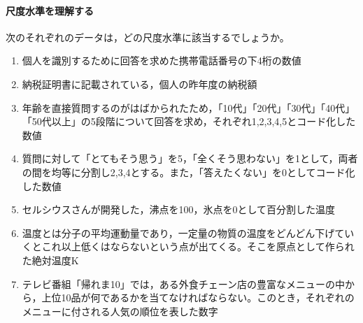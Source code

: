 \documentclass{ltjsbook}
\begin{document}
\paragraph{尺度水準を理解する}次のそれぞれのデータは，どの尺度水準に該当するでしょうか。
\begin{enumerate}
    \item 個人を識別するために回答を求めた携帯電話番号の下4桁の数値 
    \item 納税証明書に記載されている，個人の昨年度の納税額
    \item 年齢を直接質問するのがはばかられたため，「10代」「20代」「30代」「40代」「50代以上」の5段階について回答を求め，それぞれ1,2,3,4,5とコード化した数値
    \item 質問に対して「とてもそう思う」を5，「全くそう思わない」を1として，両者の間を均等に分割し2,3,4とする。また，「答えたくない」を0としてコード化した数値
    \item セルシウスさんが開発した，沸点を100，氷点を0として百分割した温度
    \item 温度とは分子の平均運動量であり，一定量の物質の温度をどんどん下げていくとこれ以上低くはならないという点が出てくる。そこを原点として作られた絶対温度K
    \item テレビ番組「帰れま10」では，ある外食チェーン店の豊富なメニューの中から，上位10品が何であるかを当てなければならない。このとき，それぞれのメニューに付される人気の順位を表した数字
\end{enumerate}
\end{document}
